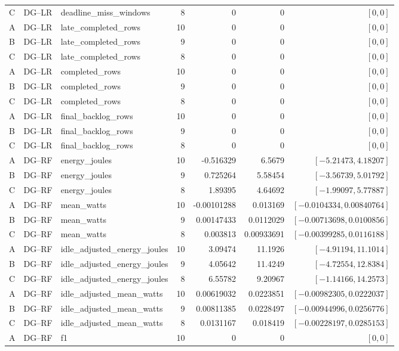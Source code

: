 \begin{longtable}{lllrrrr}
C & DG--LR & deadline\_miss\_windows & 8 & 0 & 0 & $[0,0]$\\
A & DG--LR & late\_completed\_rows & 10 & 0 & 0 & $[0,0]$\\
B & DG--LR & late\_completed\_rows & 9 & 0 & 0 & $[0,0]$\\
C & DG--LR & late\_completed\_rows & 8 & 0 & 0 & $[0,0]$\\
A & DG--LR & completed\_rows & 10 & 0 & 0 & $[0,0]$\\
B & DG--LR & completed\_rows & 9 & 0 & 0 & $[0,0]$\\
C & DG--LR & completed\_rows & 8 & 0 & 0 & $[0,0]$\\
A & DG--LR & final\_backlog\_rows & 10 & 0 & 0 & $[0,0]$\\
B & DG--LR & final\_backlog\_rows & 9 & 0 & 0 & $[0,0]$\\
C & DG--LR & final\_backlog\_rows & 8 & 0 & 0 & $[0,0]$\\
A & DG--RF & energy\_joules & 10 & -0.516329 & 6.5679 & $[-5.21473,4.18207]$\\
B & DG--RF & energy\_joules & 9 & 0.725264 & 5.58454 & $[-3.56739,5.01792]$\\
C & DG--RF & energy\_joules & 8 & 1.89395 & 4.64692 & $[-1.99097,5.77887]$\\
A & DG--RF & mean\_watts & 10 & -0.00101288 & 0.013169 & $[-0.0104334,0.00840764]$\\
B & DG--RF & mean\_watts & 9 & 0.00147433 & 0.0112029 & $[-0.00713698,0.0100856]$\\
C & DG--RF & mean\_watts & 8 & 0.003813 & 0.00933691 & $[-0.00399285,0.0116188]$\\
A & DG--RF & idle\_adjusted\_energy\_joules & 10 & 3.09474 & 11.1926 & $[-4.91194,11.1014]$\\
B & DG--RF & idle\_adjusted\_energy\_joules & 9 & 4.05642 & 11.4249 & $[-4.72554,12.8384]$\\
C & DG--RF & idle\_adjusted\_energy\_joules & 8 & 6.55782 & 9.20967 & $[-1.14166,14.2573]$\\
A & DG--RF & idle\_adjusted\_mean\_watts & 10 & 0.00619032 & 0.0223851 & $[-0.00982305,0.0222037]$\\
B & DG--RF & idle\_adjusted\_mean\_watts & 9 & 0.00811385 & 0.0228497 & $[-0.00944996,0.0256776]$\\
C & DG--RF & idle\_adjusted\_mean\_watts & 8 & 0.0131167 & 0.018419 & $[-0.00228197,0.0285153]$\\
A & DG--RF & f1 & 10 & 0 & 0 & $[0,0]$\\

\end{longtable}
